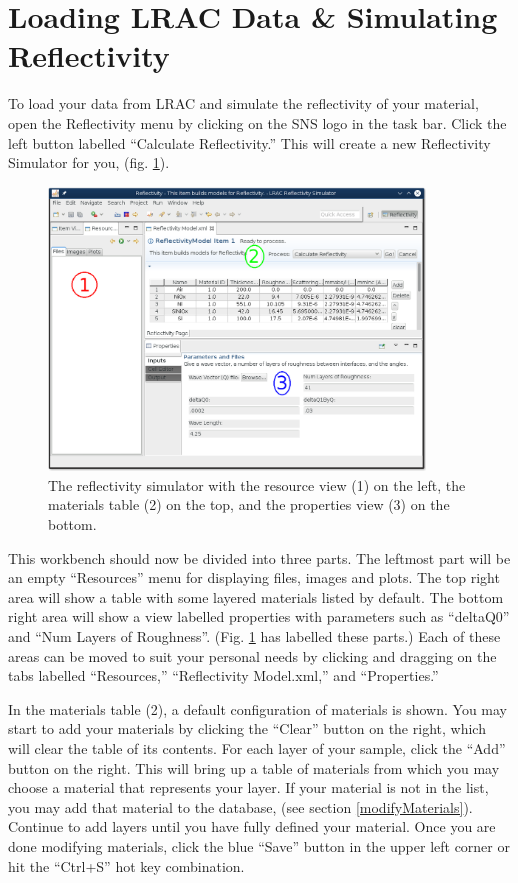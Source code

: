 \documentclass{article}
\begin{document}
\section{Loading LRAC Data \& Simulating Reflectivity}
\label{simulate}

To load your data from LRAC and simulate the reflectivity of your material, open
the Reflectivity menu by clicking on the SNS logo in the task bar. Click the
left button labelled ``Calculate Reflectivity.'' This will create a new
Reflectivity Simulator for you, (fig. \ref{simulator}).

\begin{figure}[!h]
\centering
\includegraphics[width=10cm]{images/simulator_sections.png}
\caption{The reflectivity simulator with the resource view (1) on the left, the
materials table (2) on the top, and the properties view (3) on the bottom.}
\label{simulator}
\end{figure}

This workbench should now be divided into three parts. The leftmost part will be
an empty ``Resources'' menu for displaying files, images and plots. The top
right area will show a table with some layered materials listed by default. The
bottom right area will show a view labelled properties with parameters such as
``deltaQ0'' and ``Num Layers of Roughness''. (Fig. \ref{simulator} has labelled
these parts.) Each of these areas can be moved to suit your personal needs by
clicking and dragging on the tabs labelled ``Resources,'' ``Reflectivity
Model.xml,'' and ``Properties.''

In the materials table (2), a default configuration of materials is shown. You
may start to add your materials by clicking the ``Clear'' button on the right,
which will clear the table of its contents. For each layer of your sample, click
the ``Add'' button on the right. This will bring up a table of materials from
which you may choose a material that represents your layer. If your material is
not in the list, you may add that material to the database, (see section
\ref{modifyMaterials}). Continue to add layers until you have fully defined your
material. Once you are done modifying materials, click the blue ``Save'' button
in the upper left corner or hit the ``Ctrl+S'' hot key combination.
\end{document}
